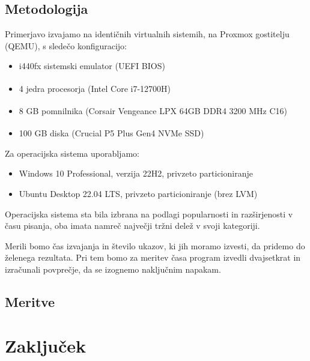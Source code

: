 \documentclass[a4paper,12pt,openright]{book}
\begin{document}
\section{Metodologija}

Primerjavo izvajamo na identičnih virtualnih sistemih, na Proxmox gostitelju (QEMU), s sledečo konfiguracijo:
\begin{itemize}
	\item i440fx sistemski emulator (UEFI BIOS)
	\item 4 jedra procesorja (Intel\textsuperscript{\textregistered} Core\textsuperscript{\texttrademark} i7-12700H)
	\item 8 GB pomnilnika (Corsair\textsuperscript{\textregistered} Vengeance\textsuperscript{\textregistered} LPX 64GB DDR4 3200 MHz C16)
	\item 100 GB diska (Crucial\textsuperscript{\textregistered} P5 Plus Gen4 NVMe SSD)
\end{itemize}

Za operacijska sistema uporabljamo:
\begin{itemize}
	\item Windows 10 Professional, verzija 22H2, privzeto particioniranje
	\item Ubuntu Desktop 22.04 LTS, privzeto particioniranje (brez LVM)
\end{itemize}
Operacijska sistema sta bila izbrana na podlagi popularnosti in razširjenosti v času pisanja, oba imata namreč največji tržni delež v svoji kategoriji.

Merili bomo čas izvajanja in število ukazov, ki jih moramo izvesti, da pridemo do želenega rezultata.
Pri tem bomo za meritev časa program izvedli dvajsetkrat in izračunali povprečje, da se izognemo naključnim napakam.

\section{Meritve}

\chapter{Zaključek}


\printbibliography[heading=bibintoc,title={Literatura}]
\end{document}
